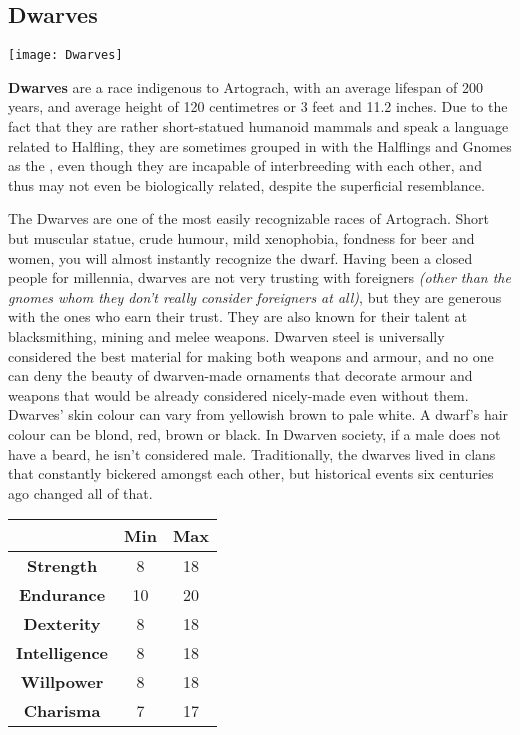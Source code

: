 \subsection{Dwarves}


\texttt{[image: Dwarves]}


\textbf{Dwarves} are a race indigenous to Artograch, with an average lifespan of 200 years, and average height of 120 centimetres or 3 feet and 11.2 inches. Due to the fact that they are rather short-statued humanoid mammals and speak a language related to Halfling, they are sometimes grouped in with the Halflings and Gnomes as the , even though they are incapable of interbreeding with each other, and thus may not even be biologically related, despite the superficial resemblance.


The Dwarves are one of the most easily recognizable races of Artograch. Short but muscular statue, crude humour, mild xenophobia, fondness for beer and women, you will almost instantly recognize the dwarf. Having been a closed people for millennia, dwarves are not very trusting with foreigners \textit{(other than the gnomes whom they don’t really consider foreigners at all)}, but they are generous with the ones who earn their trust. They are also known for their talent at blacksmithing, mining and melee weapons. Dwarven steel is universally considered the best material for making both weapons and armour, and no one can deny the beauty of dwarven-made ornaments that decorate armour and weapons that would be already considered nicely-made even without them. Dwarves’ skin colour can vary from yellowish brown to pale white. A dwarf's hair colour can be blond, red, brown or black. In Dwarven society, if a male does not have a beard, he isn't considered male. Traditionally, the dwarves lived in clans that constantly bickered amongst each other, but historical events six centuries ago changed all of that.


\begin{tabular}{|c|c|c|}
\hline
 & \textbf{Min} & \textbf{Max} \\ \hline
\textbf{Strength} & 8 & 18 \\ \hline
\textbf{Endurance} & 10 & 20 \\ \hline
\textbf{Dexterity} & 8 & 18 \\ \hline
\textbf{Intelligence} & 8 & 18 \\ \hline
\textbf{Willpower} & 8 & 18 \\ \hline
\textbf{Charisma} & 7 & 17 \\ \hline
\end{tabular}


 \newpage
